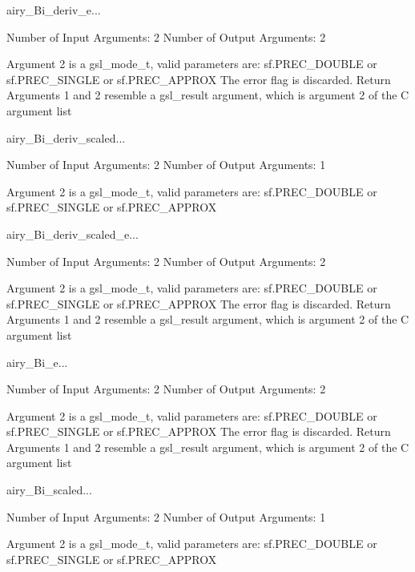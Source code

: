 \begin{funcdesc}{airy_Bi_deriv_e}{...}

    Number of Input  Arguments:  2
    Number of Output Arguments:  2

 Argument 2 is a gsl_mode_t, valid parameters are:
	sf.PREC_DOUBLE or sf.PREC_SINGLE or sf.PREC_APPROX
The error flag is discarded.
Return Arguments 1 and 2 resemble a gsl_result argument,
	which is  argument 2 of the C argument list

\end{funcdesc}

\begin{funcdesc}{airy_Bi_deriv_scaled}{...}

    Number of Input  Arguments:  2
    Number of Output Arguments:  1

 Argument 2 is a gsl_mode_t, valid parameters are:
	sf.PREC_DOUBLE or sf.PREC_SINGLE or sf.PREC_APPROX

\end{funcdesc}

\begin{funcdesc}{airy_Bi_deriv_scaled_e}{...}

    Number of Input  Arguments:  2
    Number of Output Arguments:  2

 Argument 2 is a gsl_mode_t, valid parameters are:
	sf.PREC_DOUBLE or sf.PREC_SINGLE or sf.PREC_APPROX
The error flag is discarded.
Return Arguments 1 and 2 resemble a gsl_result argument,
	which is  argument 2 of the C argument list

\end{funcdesc}

\begin{funcdesc}{airy_Bi_e}{...}

    Number of Input  Arguments:  2
    Number of Output Arguments:  2

 Argument 2 is a gsl_mode_t, valid parameters are:
	sf.PREC_DOUBLE or sf.PREC_SINGLE or sf.PREC_APPROX
The error flag is discarded.
Return Arguments 1 and 2 resemble a gsl_result argument,
	which is  argument 2 of the C argument list

\end{funcdesc}

\begin{funcdesc}{airy_Bi_scaled}{...}

    Number of Input  Arguments:  2
    Number of Output Arguments:  1

 Argument 2 is a gsl_mode_t, valid parameters are:
	sf.PREC_DOUBLE or sf.PREC_SINGLE or sf.PREC_APPROX

\end{funcdesc}

